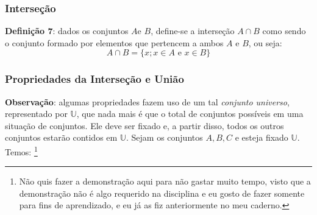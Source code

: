 \documentclass[13pt,letterpaper]{article}
\begin{document}
\subsubsection{Interseção}
\textbf{Definição 7}: dados os conjuntos $A$e $B$, define-se a interseção $A \cap B$ como sendo o conjunto formado por elementos que pertencem a ambos $A$ e $B$, ou seja:
\begin{displaymath}
    A \cap B = \{ x; x \in A \text{ e } x \in B \}
\end{displaymath}

\subsubsection{Propriedades da Interseção e União}
\textbf{Observação}: algumas propriedades fazem uso de um tal \emph{conjunto universo}, representado por $\mathbb{U}$, que nada mais é que o total de conjuntos possíveis em uma situação de conjuntos. Ele deve ser fixado e, a partir disso, todos os outros conjuntos estarão contidos em $\mathbb{U}$.
Sejam os conjuntos $A, B, C$ e esteja fixado $\mathbb{U}$. Temos: \footnote{Não quis fazer a demonstração aqui para não gastar muito tempo, visto que a demonstração não é algo requerido na disciplina e eu gosto de fazer somente para fins de aprendizado, e eu já as fiz anteriormente no meu caderno.}
\end{document}
